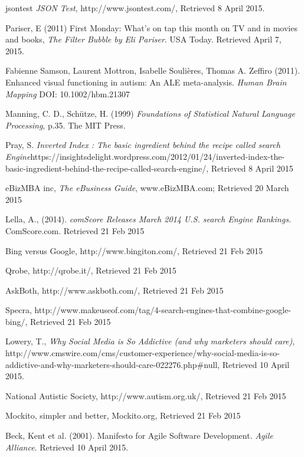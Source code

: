 \documentclass[a4paper, 10pt]{article}
\begin{document}
\begin{thebibliography}{100}
jsontest \textit{JSON Test}, http://www.jsontest.com/, Retrieved 8 April 2015.

 Pariser, E (2011) First Monday: What's on tap this month on TV and in movies and books, \textit{The Filter Bubble by Eli Pariser}. USA Today. Retrieved April 7, 2015. 

Fabienne Samson, Laurent Mottron, Isabelle Soulières, Thomas A. Zeffiro (2011). Enhanced visual functioning in autism: An ALE meta-analysis. \textit{Human Brain Mapping} DOI: 10.1002/hbm.21307

Manning, C. D., Schütze, H. (1999) \textit{Foundations of Statistical Natural Language Processing}, p.35. The MIT Press.

 Pray, S. \textit{Inverted Index : The basic ingredient behind the recipe called search Engine}https://insightsdelight.wordpress.com/2012/01/24/inverted-index-the-basic-ingredient-behind-the-recipe-called-search-engine/, Retrieved 8 April 2015

eBizMBA inc, \textit{The eBusiness Guide}, www.eBizMBA.com; Retrieved 20 March 2015

Lella, A., (2014). \textit{comScore Releases March 2014 U.S. search Engine Rankings.} ComScore.com. Retrieved 21 Feb 2015

 Bing versus Google, http://www.bingiton.com/, Retrieved 21 Feb 2015 

 Qrobe, http://qrobe.it/, Retrieved 21 Feb 2015 

 AskBoth, http://www.askboth.com/, Retrieved 21 Feb 2015 

 Specra, http://www.makeuseof.com/tag/4-search-engines-that-combine-google-bing/, Retrieved 21 Feb 2015 

 Lowery, T., \textit{Why Social Media is So Addictive (and why marketers should care)}, http://www.cmswire.com/cms/customer-experience/why-social-media-is-so-addictive-and-why-marketers-should-care-022276.php\#null, Retrieved 10 April 2015.

 National Autistic Society, http://www.autism.org.uk/, Retrieved 21 Feb 2015

 Mockito, simpler and better, Mockito.org, Retrieved 21 Feb 2015

 Beck, Kent et al. (2001). Manifesto for Agile Software Development. \textit{Agile Alliance}. Retrieved 10 April 2015.

\end{thebibliography}
\end{document}
